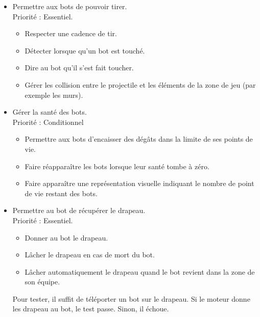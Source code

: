 \documentclass[french]{article}
\begin{document}
\begin{itemize}
            
        \item Permettre aux bots de pouvoir tirer. \\
            Priorité : Essentiel.
            \begin{itemize}
                \item Respecter une cadence de tir.
                \item Détecter lorsque qu'un bot est touché.
                \item Dire au bot qu'il s'est fait toucher.
                \item Gérer les collision entre le projectile et les éléments de la zone de jeu (par exemple les murs).\\
            \end{itemize}

        \item Gérer la santé des bots.\\
            Priorité : Conditionnel
            \begin{itemize}
                \item Permettre aux bots d'encaisser des dégâts dans la limite de ses points de vie.
                \item Faire réapparaître les bots lorsque leur santé tombe à zéro.
                \item Faire apparaître une représentation visuelle indiquant le nombre de point de vie restant des bots.\\
            \end{itemize}
        

        \item Permettre au bot de récupérer le drapeau. \\
            Priorité : Essentiel.
            \begin{itemize}
                \item Donner au bot le drapeau.
                \item Lâcher le drapeau en cas de mort du bot.
                \item Lâcher automatiquement le drapeau quand le bot revient dans la zone de son équipe.\\
            \end{itemize}
            Pour tester, il suffit de téléporter un bot sur le drapeau. Si le moteur donne les drapeau au bot, le test passe. Sinon, il échoue.\\
        

\end{itemize}
\end{document}
